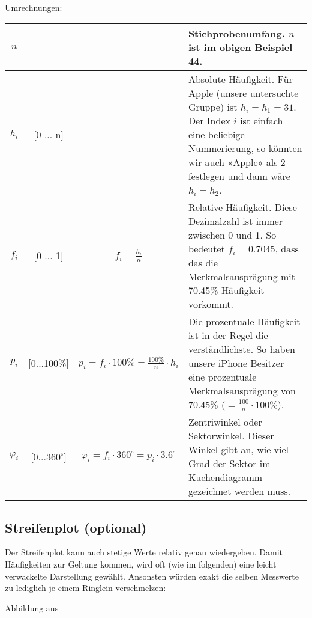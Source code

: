 Umrechnungen:

\begin{tabular}{|c|c|c|p{8cm}|}
  \hline
  $n$   &   &  &Stichprobenumfang. $n$ ist im obigen Beispiel 44.\\
  \hline
  $h_i$ & [0 ... n]  & & Absolute Häufigkeit. Für Apple (unsere untersuchte
  Gruppe) ist $h_i=h_1=31$. Der Index $i$ ist einfach eine beliebige
  Nummerierung, so könnten wir auch «Apple» als $2$ festlegen und dann
  wäre $h_i=h_2$.\\
  \hline
  $f_i$ & [0 ... 1] &$f_i = \frac{h_i}{n}$ & Relative
  Häufigkeit. Diese Dezimalzahl ist immer zwischen 0 und 1. So
  bedeutet $f_i=0.7045$, dass das die Merkmalsausprägung mit 70.45\%
  Häufigkeit vorkommt.\\
  \hline
  $p_i$ & [0...100\%] & $p_i = f_i\cdot{}100\% =
  \frac{100\%}{n}\cdot{}h_i$ & Die prozentuale Häufigkeit ist in der
  Regel die verständlichste. So haben unsere iPhone Besitzer eine
  prozentuale Merkmalsausprägung von 70.45\%
  ($=\frac{100}{n}\cdot{}100\%$).\\
  \hline
  $\varphi_i$ & [0...$360^{\circ}$] & $\varphi_i = f_i\cdot{}360^\circ
  = p_i\cdot{}3.6^\circ$ &
  Zentriwinkel oder Sektorwinkel. Dieser Winkel gibt an, wie viel Grad
  der Sektor im Kuchendiagramm gezeichnet werden muss.\\
  \hline
\end{tabular}
\newpage


\subsection{Streifenplot (optional)}
Der Streifenplot kann auch stetige Werte relativ genau wiedergeben. Damit Häufigkeiten zur Geltung kommen, wird oft (wie im folgenden) eine leicht verwackelte Darstellung gewählt. Ansonsten würden exakt die selben Messwerte zu lediglich je einem Ringlein verschmelzen:


Abbildung aus \cite{marthaler21}
\newpage




